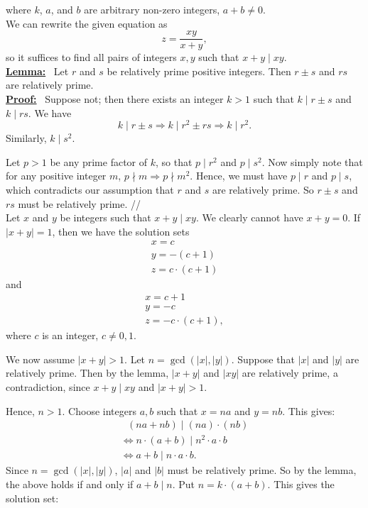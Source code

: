\documentclass{ximera}
\begin{document}
\noindent where $k$, $a$, and $b$ are arbitrary non-zero integers, $a+b\neq0$. \\

\noindent  We can rewrite the given equation as
$$ z = \frac{xy}{x+y}, $$
so it suffices to find all pairs of integers $ x, y $ such that $x+y \mid xy$. \\
 
\noindent  \underline{\textbf{Lemma:}} \ Let $r$ and $s$ be relatively prime positive integers.  Then $r\pm s$ and $rs$ are relatively prime. \\

\noindent  \underline{\textbf{Proof:}} \ Suppose not; then there exists an integer $k > 1$ such that $k \mid r\pm s$ and $k \mid rs$.  We have \\  

\noindent  \[ k \mid r \pm s \Rightarrow k \mid r^2 \pm rs \Rightarrow k \mid r^2. \]
Similarly, $ k \mid s^2. $

Let $p > 1$ be any prime factor of $k$, so that $p \mid r^2$ and $p \mid s^2$.  
Now simply note that for any positive integer $m$, $ p \nmid m \Rightarrow p \nmid m^2$. 
Hence, we must have $p \mid r$ and $p \mid s$, which contradicts our assumption that $r$ and $s$ are relatively prime.  So $r \pm s$ and $rs$ must be relatively prime. // \\

Let $x$ and $y$ be integers such that $x+y \mid xy$.  We clearly cannot have $x+y = 0$.
If $\left|x+y\right| = 1$, then we have the solution sets
$$ \begin{array}{l}
x = c \\
y = -\left(c + 1\right) \\
z = c\cdot\left(c+1\right)
\end{array} $$
and
$$ \begin{array}{l}
x = c+1 \\
y = -c \\
z = -c\cdot\left(c+1\right),
\end{array} $$
where $c$ is an integer, $c \neq 0, 1$.

We now assume $\left|x+y\right| > 1 $.  
Let $n = \gcd\left(\left|x\right|,\left|y\right|\right)$.  Suppose that $\left|x\right|$ and $\left|y\right|$ are relatively prime.  
Then by the lemma, $\left|x+y\right|$ and $\left|xy\right|$ are relatively prime, a contradiction, since $x+y \mid xy$ and $\left|x+y\right| > 1 $.

\noindent Hence, $n > 1$.  Choose integers $a, b$ such that $x = na$ and $y = nb$.
This gives:
$$ \begin{array}{l}
\ \  \ \left(na + nb\right) \mid \left(na\right) \cdot \left(nb\right) \\ 
\Leftrightarrow n \cdot \left(a+b\right) \mid n^2 \cdot a \cdot b \\ 
\Leftrightarrow a+b \mid n \cdot a \cdot b. 
\end{array} $$
Since $n = \gcd\left(\left|x\right|,\left|y\right|\right)$, $\left|a\right|$ and $\left|b\right|$ must be relatively prime.
So by the lemma, the above holds if and only if $a+b \mid n$.  Put $n = k \cdot \left(a + b\right)$.  This gives the solution set:
\end{document}
